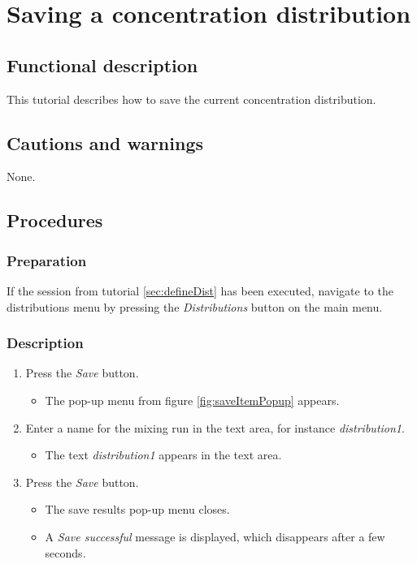 \section{Saving a concentration distribution}\label{sec:savdist}

\subsection{Functional description}
This tutorial describes how to save the current concentration distribution.

\subsection{Cautions and warnings}
None.

\subsection{Procedures}

\subsubsection{Preparation}
If the session from tutorial \ref{sec:defineDist} has been executed, navigate to the distributions menu by pressing the \emph{Distributions} button on the main menu.

\subsubsection{Description}
\begin{enumerate}
	\item Press the \emph{Save} button.
		\begin{itemize}
			\item The pop-up menu from figure \ref{fig:saveItemPopup} appears.
		\end{itemize}
	\item Enter a name for the mixing run in the text area, for instance \emph{distribution1}.
		\begin{itemize}
			\item The text \emph{distribution1} appears in the text area.
		\end{itemize}
	\item Press the \emph{Save} button.
		\begin{itemize}
			\item The save results pop-up menu closes.
			\item A \emph{Save successful} message is displayed, which disappears after a few seconds.
		\end{itemize}
\end{enumerate}


